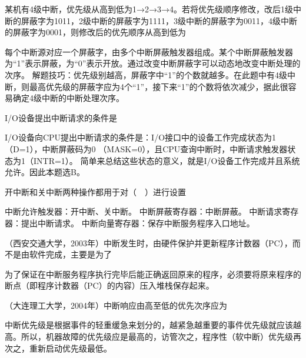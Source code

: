 \question 某机有4级中断，优先级从高到低为1→2→3→4。若将优先级顺序修改，改后1级中断的屏蔽字为1011，2级中断的屏蔽字为1111，3级中断的屏蔽字为0011，4级中断的屏蔽字为0001，则修改后的优先顺序从高到低为
\par{}
\begin{solution}每个中断源对应一个屏蔽字，由多个中断屏蔽触发器组成。某个中断屏蔽触发器为``1''表示屏蔽，为``0''表示开放。通过改变中断屏蔽字可以动态地改变中断处理的次序。
解题技巧：优先级别越高，屏蔽字中``1''的个数就越多。在此题中有4级中断，则最高优先级的屏蔽字应为4个``1''，接下来``1''的个数将依次减少，据此很容易确定4级中断的中断处理次序。
\end{solution}
\question I/O设备提出中断请求的条件是
\par{}
\begin{solution}I/O设备向CPU提出中断请求的条件是：I/O接口中的设备工作完成状态为1（D=1），中断屏蔽码为0
（MASK=0），且CPU查询中断时，中断请求触发器状态为1（INTR=1）。
简单来总结这些状态的意义，就是I/O设备工作完成并且系统允许。因此本题选B。
\end{solution}
\question 开中断和关中断两种操作都用于对（　）进行设置
\par{}
\begin{solution}中断允许触发器：开中断、关中断。 中断屏蔽寄存器：中断屏蔽。
中断请求寄存器：提出中断请求。
中断向量寄存器：保存中断服务程序入口地址。
\end{solution}
\question （西安交通大学，2003年）中断发生时，由硬件保护并更新程序计数器（PC），而不是由软件完成，主要是为了
\par{}
\begin{solution}为了保证在中断服务程序执行完毕后能正确返回原来的程序，必须要将原来程序的断点（即程序计数器（PC）的内容）压入堆栈保存起来。
\end{solution}
\question （大连理工大学，2004年）中断响应由高至低的优先次序应为
\par{}
\begin{solution}中断优先级是根据事件的轻重缓急来划分的，越紧急越重要的事件优先级就应该越高。所以，机器故障的优先级应是最高的，访管次之，程序性（软中断）优先级再次之，重新启动优先级最低。
\end{solution}
